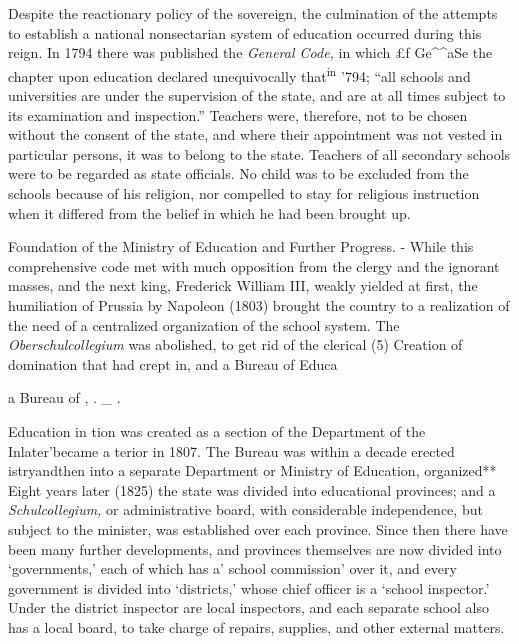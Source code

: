 \documentclass[
]{book}
\begin{document}
Despite the reactionary policy of the sovereign, the culmination of the attempts to establish a national nonsectarian system of education occurred during this reign. In 1794 there was published the \emph{General Code,} in which £f Ge\^{}\^{}aSe the chapter upon education declared unequivocally that\textsuperscript{in} '794; ``all schools and universities are under the supervision of the state, and are at all times subject to its examination and inspection.'' Teachers were, therefore, not to be chosen without the consent of the state, and where their appointment was not vested in particular persons, it was to belong to the state. Teachers of all secondary schools were to be regarded as state officials. No child was to be excluded from the schools because of his religion, nor compelled to stay for religious instruction when it differed from the belief in which he had been brought up.

Foundation of the Ministry of Education and Further Progress. - While this comprehensive code met with much opposition from the clergy and the ignorant masses, and the next king, Frederick William III, weakly yielded at first, the humiliation of Prussia by Napoleon (1803) brought the country to a realization of the need of a centralized organization of the school system. The \emph{Oberschulcollegium} was abolished, to get rid of the clerical\protect\hypertarget{ch25.xmlux5cux23para.451.1.0.box.85.234.1259.42.q.60}{}{ (5) Creation of domination that had crept in, and a Bureau of Educa}

a Bureau of , . \_ .

Education in tion was created as a section of the Department of the Inlater'became a terior in 1807. The Bureau was within a decade erected istryandthen into a separate Department or Ministry of Education, organized** Eight years later (1825) the state was divided into educational provinces; and a \emph{Schulcollegium,} or administrative board, with considerable independence, but subject to the minister, was established over each province. Since then there have been many further developments, and provinces themselves are now divided into `governments,' each of which has a' school commission' over it, and every government is divided into `districts,' whose chief officer is a `school inspector.' Under the district inspector are local inspectors, and each separate school also has a local board, to take charge of repairs, supplies, and other external matters.
\end{document}
